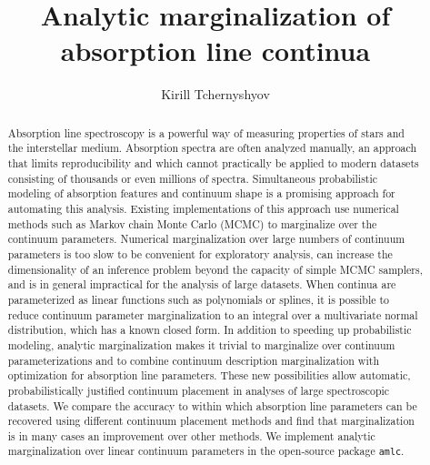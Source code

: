 \documentclass[trackchanges]{aastex62}
\newcommand{\pkgname}{\texttt{amlc}}
\begin{document}
\title{Analytic marginalization of absorption line continua}

\author[0000-0003-0789-9939]{Kirill Tchernyshyov}

\begin{abstract}
Absorption line spectroscopy is a powerful way of measuring properties of stars and the interstellar medium.
Absorption spectra are often analyzed manually, an approach that limits reproducibility and which cannot practically be applied to modern datasets consisting of thousands or even millions of spectra.
Simultaneous probabilistic modeling of absorption features and continuum shape is a promising approach for automating this analysis.
Existing implementations of this approach use numerical methods such as Markov chain Monte Carlo (MCMC) to marginalize over the continuum parameters.
Numerical marginalization over large numbers of continuum parameters is too slow to be convenient for exploratory analysis, can increase the dimensionality of an inference problem beyond the capacity of simple MCMC samplers, and is in general impractical for the analysis of large datasets.
When continua are parameterized as linear functions such as polynomials or splines, it is possible to reduce continuum parameter marginalization to an integral over a multivariate normal distribution, which has a known closed form.
In addition to speeding up probabilistic modeling, analytic marginalization makes it trivial to marginalize over continuum parameterizations and to combine continuum description marginalization with optimization for absorption line parameters.
These new possibilities allow automatic, probabilistically justified continuum placement in analyses of large spectroscopic datasets.
We compare the accuracy to within which absorption line parameters can be recovered using different continuum placement methods and find that marginalization is in many cases an improvement over other methods.
We implement analytic marginalization over linear continuum parameters in the open-source package \pkgname.
\end{abstract}

\end{document}
